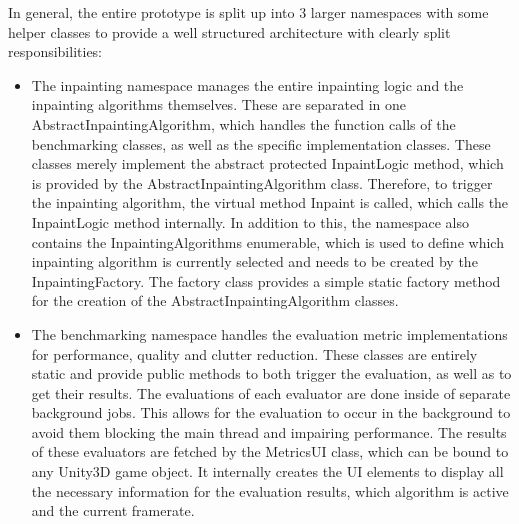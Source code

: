 In general, the entire prototype is split up into 3 larger namespaces with some helper classes to provide a well structured architecture with clearly split responsibilities:

\begin{itemize}
    \item The inpainting namespace manages the entire inpainting logic and the inpainting algorithms themselves. These are separated in one AbstractInpaintingAlgorithm, which handles the function calls of the benchmarking classes, as well as the specific implementation classes. These classes merely implement the abstract protected InpaintLogic method, which is provided by the AbstractInpaintingAlgorithm class. Therefore, to trigger the inpainting algorithm, the virtual method Inpaint is called, which calls the InpaintLogic method internally. 
    In addition to this, the namespace also contains the InpaintingAlgorithms enumerable, which is used to define which inpainting algorithm is currently selected and needs to be created by the InpaintingFactory. The factory class provides a simple static factory method for the creation of the AbstractInpaintingAlgorithm classes.

    \item The benchmarking namespace handles the evaluation metric implementations for performance, quality and clutter reduction. These classes are entirely static and provide public methods to both trigger the evaluation, as well as to get their results. The evaluations of each evaluator are done inside of separate background jobs. This allows for the evaluation to occur in the background to avoid them blocking the main thread and impairing performance.
    The results of these evaluators are fetched by the MetricsUI class, which can be bound to any Unity3D game object. It internally creates the UI elements to display all the necessary information for the evaluation results, which algorithm is active and the current framerate.


\end{itemize}
